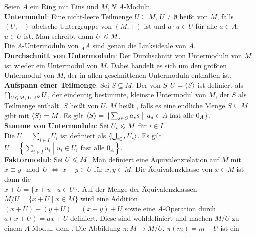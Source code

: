 \pagebreak

\begin{Bem}
    Seien $A$ ein Ring mit Eins und $M, N$ $A$-Moduln. \\
    \textbf{Untermodul}:
    Eine nicht-leere Teilmenge $U \subseteq M$, $U \not= \emptyset$
    heißt  von $M$, falls $(U,+)$ abelsche Untergruppe
    von $(M,+)$ ist und $a \cdot u \in U$ für alle $a \in A$, $u \in U$ ist.
    Man schreibt dann $U \leqslant M$. \\
    Die $A$-Untermoduln von ${}_A A$ sind genau die Linksideale von $A$. \\
    \textbf{Durchschnitt von Untermoduln}:
    Der Durchschnitt von Untermoduln von $M$ ist wieder ein Untermodul von $M$.
    Dabei handelt es sich um den größten Untermodul von $M$, der in allen
    geschnittenen Untermoduln enthalten ist. \\
    \textbf{Aufspann einer Teilmenge}:
    Sei $S \subseteq M$.
    Der von $S$  $U = \langle S \rangle$ ist definiert
    als $\bigcap_{U \leqslant M,\; U \supseteq S} U$, der eindeutig bestimmte,
    kleinste Untermodul von $M$, der $S$ als Teilmenge enthält.
    $S$ heißt  von $U$.
    $M$ heißt , falls es eine endliche Menge
    $S \subseteq M$ gibt mit $\langle S \rangle = M$.
    Es gilt $\langle S \rangle =
    \left.\left\{\sum_{s \in S} a_s s \;\right|\; a_s \in A
    \text{ fast alle } 0_A\right\}$. \\
    \textbf{Summe von Untermoduln}:
    Sei $U_i \leqslant M$ für $i \in I$. \\
    Die  $U = \sum_{i \in I} U_i$ ist definiert
    als $\langle \bigcup_{i \in I} U_i \rangle$.
    Es gilt $U = \left.\left\{\sum_{i \in I} u_i \;\right|\;
    u_i \in U_i \text{ fast alle } 0_A\right\}$. \\
    \textbf{Faktormodul}:
    Sei $U \leqslant M$.
    Man definiert eine Äquivalenzrelation auf $M$ mit
    $x \equiv y \mod U \;\Leftrightarrow\; x - y \in U$ für $x, y \in M$.
    Die Äquivalenzklasse von $x \in M$ ist dann die  \\
    $x + U = \{x + u \;|\; u \in U\}$.
    Auf der Menge der Äquivalenzklassen $M/U = \{x + U \;|\; x \in M\}$
    wird eine Addition $(x + U) + (y + U) = (x + y) + U$ sowie eine
    $A$-Operation durch $a(x + U) = ax + U$ definiert.
    Diese sind wohldefiniert und machen $M/U$ zu einem $A$-Modul,
    dem .
    Die Abbildung $\pi: M \rightarrow M/U$, $\pi(m) = m + U$ ist ein

\end{Bem}
